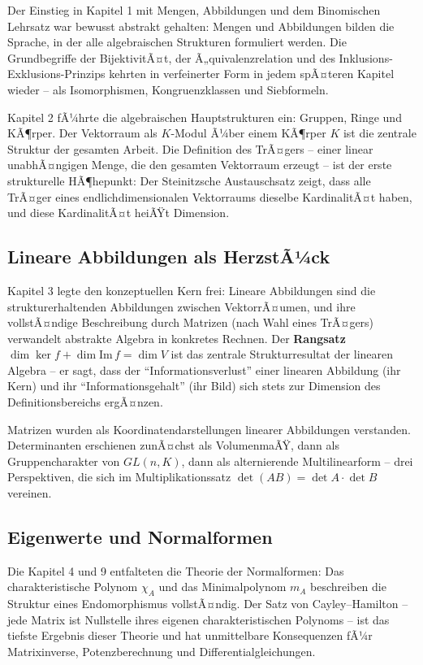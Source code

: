 ﻿\documentclass[a4paper,12pt]{report}
\theoremstyle{definition}
\begin{document}
Der Einstieg in Kapitel 1 mit Mengen, Abbildungen und dem Binomischen
Lehrsatz war bewusst abstrakt gehalten: Mengen und Abbildungen bilden
die Sprache, in der alle algebraischen Strukturen formuliert werden.
Die Grundbegriffe der BijektivitÃ¤t, der Ã„quivalenzrelation und des
Inklusions-Exklusions-Prinzips kehrten in verfeinerter Form in
jedem spÃ¤teren Kapitel wieder -- als Isomorphismen, Kongruenzklassen
und Siebformeln.

Kapitel 2 fÃ¼hrte die algebraischen Hauptstrukturen ein: Gruppen,
Ringe und KÃ¶rper. Der Vektorraum als $K$-Modul Ã¼ber einem KÃ¶rper $K$
ist die zentrale Struktur der gesamten Arbeit. Die Definition des
TrÃ¤gers -- einer linear unabhÃ¤ngigen Menge, die den gesamten
Vektorraum erzeugt -- ist der erste strukturelle HÃ¶hepunkt:
Der Steinitzsche Austauschsatz zeigt, dass alle TrÃ¤ger eines
endlichdimensionalen Vektorraums dieselbe KardinalitÃ¤t haben,
und diese KardinalitÃ¤t heiÃŸt Dimension.

\subsection*{Lineare Abbildungen als HerzstÃ¼ck}

Kapitel 3 legte den konzeptuellen Kern frei: Lineare Abbildungen
sind die strukturerhaltenden Abbildungen zwischen VektorrÃ¤umen,
und ihre vollstÃ¤ndige Beschreibung durch Matrizen (nach Wahl eines
TrÃ¤gers) verwandelt abstrakte Algebra in konkretes Rechnen.
Der \textbf{Rangsatz} $\dim\ker f + \dim\mathrm{Im}\,f = \dim V$
ist das zentrale Strukturresultat der linearen Algebra -- er sagt,
dass der ``Informationsverlust'' einer linearen Abbildung (ihr Kern)
und ihr ``Informationsgehalt'' (ihr Bild) sich stets zur Dimension
des Definitionsbereichs ergÃ¤nzen.

Matrizen wurden als Koordinatendarstellungen linearer Abbildungen
verstanden. Determinanten erschienen zunÃ¤chst als VolumenmaÃŸ,
dann als Gruppencharakter von $GL(n,K)$, dann als alternierende
Multilinearform -- drei Perspektiven, die sich im Multiplikationssatz
$\det(AB) = \det A \cdot \det B$ vereinen.

\subsection*{Eigenwerte und Normalformen}

Die Kapitel 4 und 9 entfalteten die Theorie der Normalformen:
Das charakteristische Polynom $\chi_A$ und das Minimalpolynom $m_A$
beschreiben die Struktur eines Endomorphismus vollstÃ¤ndig.
Der Satz von Cayley--Hamilton -- jede Matrix ist Nullstelle ihres
eigenen charakteristischen Polynoms -- ist das tiefste Ergebnis
dieser Theorie und hat unmittelbare Konsequenzen fÃ¼r
Matrixinverse, Potenzberechnung und Differentialgleichungen.
\end{document}
